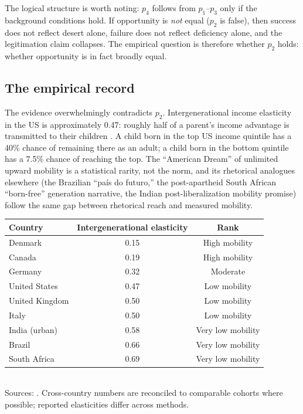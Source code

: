 The logical structure is worth noting: $p_4$ follows from $p_1$--$p_3$ only if the background conditions hold.
If opportunity is \emph{not} equal ($p_2$ is false), then success does not reflect desert alone, failure does not reflect deficiency alone, and the legitimation claim collapses.
The empirical question is therefore whether $p_2$ holds: whether opportunity is in fact broadly equal.

\subsection{The empirical record}

The evidence overwhelmingly contradicts $p_2$.
Intergenerational income elasticity in the US is approximately 0.47: roughly half of a parent's income advantage is transmitted to their children \autocite{chetty2014}.
A child born in the top US income quintile has a 40\% chance of remaining there as an adult; a child born in the bottom quintile has a 7.5\% chance of reaching the top.
The ``American Dream'' of unlimited upward mobility is a statistical rarity, not the norm, and its rhetorical analogues elsewhere (the Brazilian ``país do futuro,'' the post-apartheid South African ``born-free'' generation narrative, the Indian post-liberalization mobility promise) follow the same gap between rhetorical reach and measured mobility.

\begin{center}
\begin{tabular}{lcc}
\toprule
Country & Intergenerational elasticity & Rank \\
\midrule
Denmark & 0.15 & High mobility \\
Canada & 0.19 & High mobility \\
Germany & 0.32 & Moderate \\
United States & 0.47 & Low mobility \\
United Kingdom & 0.50 & Low mobility \\
Italy & 0.50 & Low mobility \\
India (urban) & 0.58 & Very low mobility \\
Brazil & 0.66 & Very low mobility \\
South Africa & 0.69 & Very low mobility \\
\bottomrule
\end{tabular}
\\[4pt]
\footnotesize Sources: \textcite{chetty2014, corak2013, asher2024, souza2017, finn2017}. Cross-country numbers are reconciled to comparable cohorts where possible; reported elasticities differ across methods.
\end{center}

